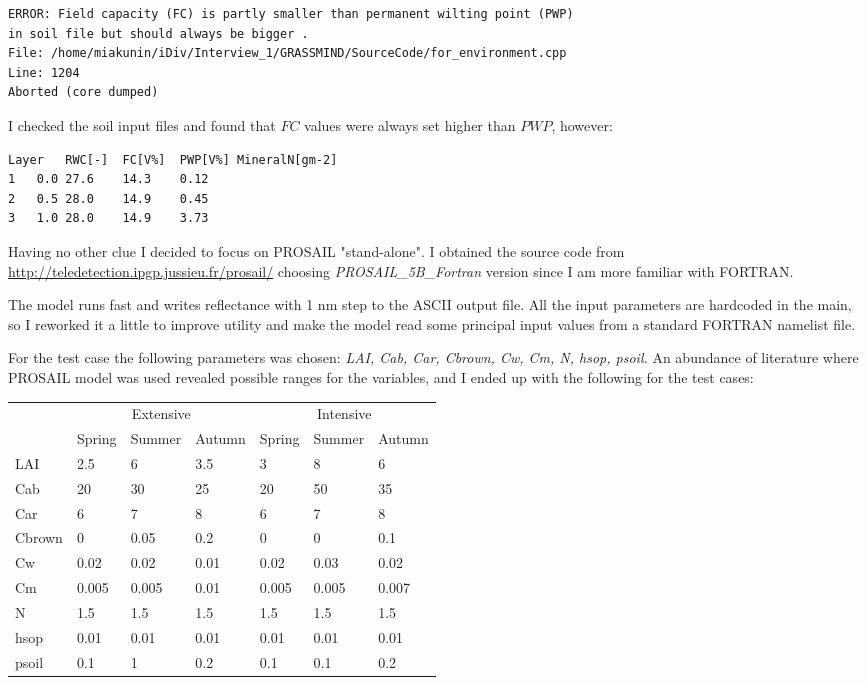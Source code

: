 \documentclass[a4paper,12pt]{article}
\begin{document}
\begin{verbatim}
ERROR: Field capacity (FC) is partly smaller than permanent wilting point (PWP) 
in soil file but should always be bigger . 
File: /home/miakunin/iDiv/Interview_1/GRASSMIND/SourceCode/for_environment.cpp  
Line: 1204
Aborted (core dumped)
\end{verbatim}

I checked the soil input files and found that $FC$ values were always set higher than $PWP$, however:
\begin{verbatim}
Layer	RWC[-]	FC[V%]	PWP[V%]	MineralN[gm-2]		
1	0.0	27.6	14.3	0.12
2	0.5	28.0	14.9	0.45
3	1.0	28.0	14.9	3.73  
\end{verbatim}

Having no other clue I decided to focus on PROSAIL "stand-alone". I obtained the source code from \url{http://teledetection.ipgp.jussieu.fr/prosail/} choosing \textit{PROSAIL\_5B\_Fortran} version since I am more familiar with FORTRAN.

The model runs fast and writes reflectance with 1 nm step to the ASCII output file. All the input parameters are hardcoded in the main, so I reworked it a little to improve utility and make the model read some principal input values from a standard FORTRAN namelist file.

For the test case the following parameters was chosen: \textit{LAI, Cab, Car, Cbrown, Cw, Cm, N, hsop, psoil.} An abundance of literature where PROSAIL model was used revealed possible ranges for the variables, and I ended up with the following for the test cases:

\begin{center}
\begin{tabular}{ l | l l l | l l l }
~	&  \multicolumn{3}{|c|}{Extensive} & \multicolumn{3}{|c}{Intensive}		\\
~	&Spring	&Summer	&Autumn	&Spring	&Summer	&Autumn \\
\hline
LAI	&2.5 	&6	&3.5 	& 3	&8	&6 \\
Cab	&20	&30&	25	&20	&50	& 35 \\
Car	&6	&7	&8	&6	&7	&8 \\
Cbrown	&0	&0.05	&0.2 &	0	&0	& 0.1\\
Cw	& 0.02	&0.02 &	0.01 &	0.02 &	0.03 &	0.02 \\
Cm	&0.005	& 0.005	&0.01	&0.005	&0.005	&0.007 \\
N	&1.5	 &1.5 &	1.5	& 1.5	& 1.5	& 1.5 \\
hsop &	0.01 &	0.01 &	0.01 &	0.01 &	0.01 &	0.01 \\
psoil &	0.1	&1	&0.2 &	0.1	&0.1 &	0.2 \\
\end{tabular}
\end{center}
\end{document}
